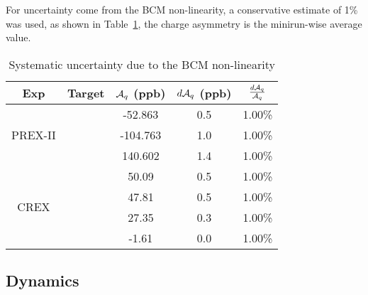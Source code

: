 For uncertainty come from the BCM non-linearity, a conservative estimate of 1\% was used,
as shown in Table~\ref{tab:AT_bcm_non-linearity}, the charge asymmetry is the 
minirun-wise average value.
\begin{table}[!h]
    \centering
    \begin{tabular}{c c | c c c}
	\hline
	Exp & Target	& $\mathcal{A}_{q}$ (ppb) & $d\mathcal{A}_{q}$ (ppb)    & $\frac{d\mathcal{A}_{q}}{\mathcal{A}_{q}}$   \\
	\hline
	\multirow{3}{*}{PREX-II}
	    & \Carbon    & -52.863   & 0.5   & 1.00\%    \\ 
	    & \ca   & -104.763  & 1.0   & 1.00\%    \\ 
	    & \Pb   & 140.602   & 1.4   & 1.00\%    \\ 
	\hline
	\multirow{4}{*}{CREX}
	    & \Carbon    & 50.09	& 0.5   & 1.00\%    \\ 
	    & \ca   & 47.81	& 0.5   & 1.00\%    \\ 
	    & \Ca   & 27.35	& 0.3   & 1.00\%    \\ 
	    & \Pb   & -1.61	& 0.0   & 1.00\%    \\ 
	\hline
    \end{tabular}
    \caption{Systematic uncertainty due to the BCM non-linearity}
    \label{tab:AT_bcm_non-linearity}
\end{table}

\subsection{Dynamics}

